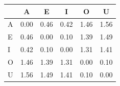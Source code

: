 \begin{tabular}{lccccc}
\toprule
\rowcolor{col01}
 & A & E & I & O & U \\
\midrule
A & 0.00 & 0.46 & 0.42 & 1.46 & 1.56 \\
E & 0.46 & 0.00 & 0.10 & 1.39 & 1.49 \\
I & 0.42 & 0.10 & 0.00 & 1.31 & 1.41 \\
O & 1.46 & 1.39 & 1.31 & 0.00 & 0.10 \\
U & 1.56 & 1.49 & 1.41 & 0.10 & 0.00 \\
\bottomrule
\end{tabular}
